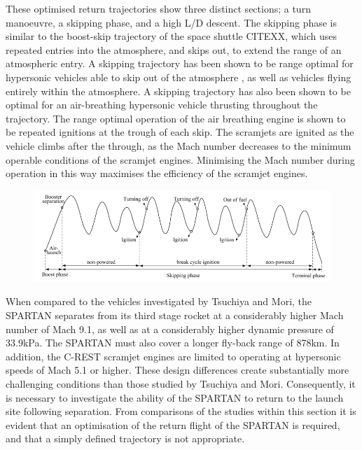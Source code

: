 These optimised return trajectories show three distinct sections; a turn manoeuvre, a skipping phase, and a high L/D descent. The skipping phase is similar to the boost-skip trajectory of the space shuttle CITEXX, which uses repeated entries into the atmosphere, and skips out, to extend the range of an atmospheric entry. A skipping trajectory has been shown to be range optimal for hypersonic vehicles able to skip out of the atmosphere \cite{Moshman2014}, as well as vehicles flying entirely within the atmosphere\cite{Moshman2014,Darby2011}. A skipping trajectory has also been shown to be optimal for an air-breathing hypersonic vehicle thrusting throughout the trajectory\cite{Chai2015}. The range optimal operation of the air breathing engine is shown to be repeated ignitions at the trough of each skip. The scramjets are ignited as the vehicle climbs after the through, as the Mach number decreases to the minimum operable conditions of the scramjet engines. Minimising the Mach number during operation in this way maximises the efficiency of the scramjet engines.

\begin{figure}
\centering
\includegraphics[width=0.9\linewidth]{"figures/2_literature-review/chai-boost skip"}
\caption{}
\label{fig:chai-boostskip}
\end{figure}


When compared to the vehicles investigated by Tsuchiya and Mori\cite{Tsuchiya2005}, the SPARTAN separates from its third stage rocket at a considerably higher Mach number of Mach 9.1, as well as at a considerably higher dynamic pressure of 33.9kPa. The SPARTAN must also cover a longer fly-back range of 878km. In addition, the C-REST scramjet engines are limited to operating at hypersonic speeds of Mach 5.1 or higher. These design differences create substantially more challenging conditions than those studied by Tsuchiya and Mori. Consequently, it is necessary to investigate the ability of the SPARTAN to return to the launch site following separation. From comparisons of the studies within this section it is evident that an optimisation of the return flight of the SPARTAN is required, and that a simply defined trajectory is not appropriate.

